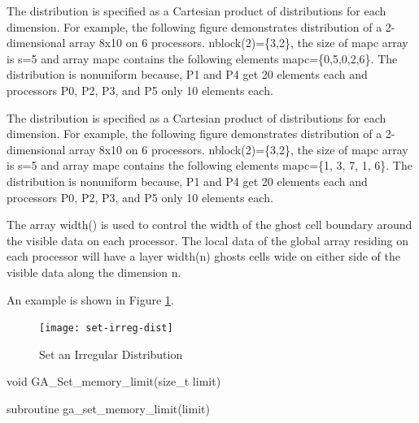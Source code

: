 \documentclass[12pt]{article}
\begin{document}
\begin{cxxdesc}
The distribution is specified as a Cartesian product of distributions for each
dimension. For example, the following figure demonstrates distribution of a
2-dimensional array 8x10 on 6 processors. nblock(2)=\{3,2\}, the size
of mapc array is s=5 and array mapc contains the following elements
mapc=\{0,5,0,2,6\}. The distribution is nonuniform because, P1 and P4 get 20
elements each and processors P0, P2, P3, and P5 only 10 elements each.
\end{cxxdesc}

\begin{pydesc}
The distribution is specified as a Cartesian product of distributions for each
dimension. For example, the following figure demonstrates distribution of a
2-dimensional array 8x10 on 6 processors. nblock(2)=\{3,2\}, the size
of mapc array is s=5 and array mapc contains the following elements mapc=\{1,
3, 7, 1, 6\}. The distribution is nonuniform because, P1 and P4 get 20 elements
each and processors P0, P2, P3, and P5 only 10 elements each.
\end{pydesc}

\begin{desc}
The array width() is used to control the width of the ghost cell boundary
around the visible data on each processor. The local data of the global array
residing on each processor will have a layer width(n) ghosts cells wide on
either side of the visible data along the dimension n.

An example is shown in Figure \ref{setirregdist}.

\begin{figure}
\centering
\texttt{[image: set-irreg-dist]}
\caption{Set an Irregular Distribution}
\label{setirregdist}
\end{figure}

\end{desc}



\begin{capi}
\begin{ccode}
void GA_Set_memory_limit(size_t limit)
\end{ccode}
\begin{funcargs}
\end{funcargs}
\end{capi}
\begin{fapi}
\begin{fcode}
subroutine ga_set_memory_limit(limit)
\end{fcode}
\begin{funcargs}
\end{funcargs}
\end{fapi}
\end{document}
